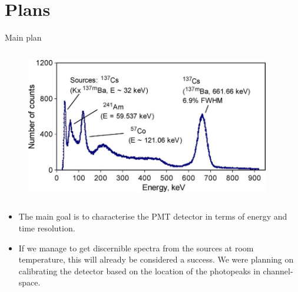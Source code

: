 
\section{Plans}

\begin{columnframe}{Main plan}
    \begin{column}{0.5\textwidth}
        \begin{figure}
            \centering
            \includegraphics[width=0.95\textwidth]{images/Cs137_expected_spectrum.jpg}
        \end{figure}
    \end{column}
    \begin{column}{0.5\textwidth}
        \begin{itemize}
            \item The main goal is to characterise the PMT detector in terms of energy and time resolution.
            \item If we manage to get discernible spectra from the sources at room temperature, this will already be considered a success. We were planning on calibrating the detector based on the location of the photopeaks in channel-space.
        \end{itemize}
    \end{column}
\end{columnframe}

